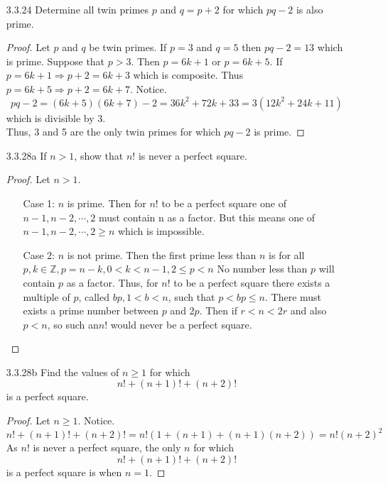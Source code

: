 \documentclass[12pt]{article}
\newcommand{\Z}{\mathds{Z}}
\begin{document}
\begin{enumerate}
	\item[3.3.24] Determine all twin primes $ p $ and $ q = p+2 $ for which $ pq-2 $ is also prime.
		\begin{proof}
			Let $ p $ and $ q $ be twin primes. If $ p=3 $ and $ q=5 $ then $ pq-2 =13$	which is prime. Suppose that $ p>3 $. Then $ p=6k+1 $ or $ p=6k+5 $. If $ p=6k+1 \Rightarrow p+2 = 6k+3 $ which is composite. Thus $ p=6k+5 \Rightarrow p+2 = 6k+7 $. Notice.
			\[pq-2=(6k+5)(6k+7)-2=36k^2+72k+33=3(12k^2+24k+11)\] which is divisible by 3.\\
			Thus, 3 and 5 are the only twin primes for which $ pq-2 $ is prime.
		\end{proof}
	\item[3.3.28a] If $ n>1 $, show that $ n! $ is never a perfect square.
		\begin{proof}
			Let $ n>1 $.
			\begin{enumerate}
				\item [Case 1:] $ n $ is prime. Then for $ n! $ to be a perfect square one of $ n-1,n-2,\cdots,2 $ must contain n as a factor. But this means one of $n-1,n-2,\cdots,2 \geq n $ which is impossible.
				\item[Case 2:] $ n $ is not prime. Then the first prime less than $ n $ is for all $p,k\in\Z, p = n-k,0<k<n-1,2\leq p < n $ No number less than $ p $ will contain $p$ as a factor. Thus, for $ n! $ to be a perfect square there exists a multiple of $ p $, called $ bp, 1<b<n$, such that $p<bp≤n$. There must exists a prime number between $ p $ and $ 2p $. Then if $ r<n<2r $ and also $ p<n  $, so such an$  n! $ would never be a perfect square.
			\end{enumerate}
		\end{proof}
	\item[3.3.28b] Find the values of $ n\geq1 $ for which
		\[n!+(n+1)!+(n+2)!\]
		is a perfect square.
		\begin{proof}
			Let $ n \geq 1 $. Notice.
			\[n!+(n+1)!+(n+2)!=n!(1+(n+1)+(n+1)(n+2))=n!(n+2)^2\]
			As $ n! $ is never a perfect square, the only $ n $ for which \[n!+(n+1)!+(n+2)!\] is a perfect square is when $ n=1 $.
		\end{proof}
\end{enumerate}
\end{document}
